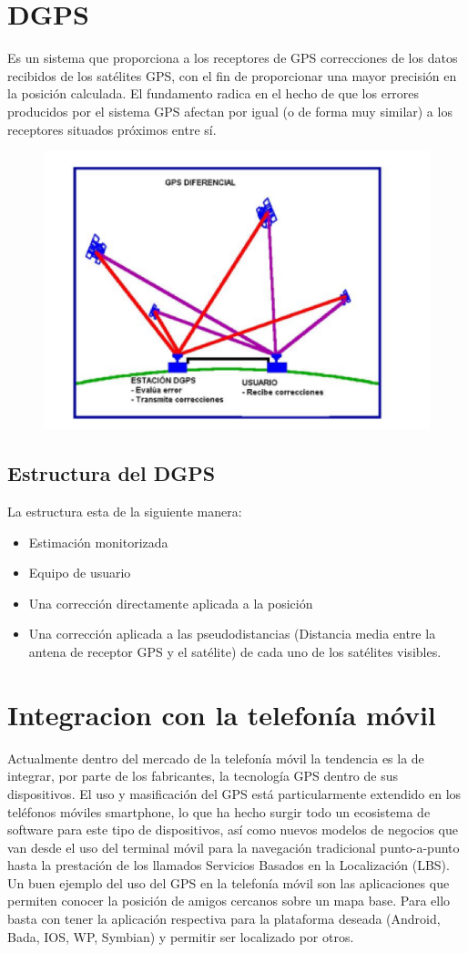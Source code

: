 \section{DGPS}
Es un sistema que proporciona a los receptores de GPS correcciones de los datos recibidos de los satélites GPS, con el fin de proporcionar una mayor precisión en la posición calculada.
El fundamento radica en el hecho de que los errores producidos por el sistema GPS afectan por igual (o de forma muy similar) a los receptores situados próximos entre sí.
\begin{figure}[htbp]
	\begin{center}
		\includegraphics[width=.3\textwidth]{images/imgmarco/dgps}
		\label{fig:dgps}
	\end{center}
\end{figure}
\subsection{Estructura del DGPS}
La estructura esta de la siguiente manera:
\begin{itemize}
\item Estimación monitorizada
\item Equipo de usuario 
\item Una corrección directamente aplicada a la posición 
\item Una corrección aplicada a las pseudodistancias (Distancia media entre la antena de receptor GPS y el satélite) de cada uno de los satélites visibles.
\end{itemize}

\section{Integracion con la telefonía móvil}
Actualmente dentro del mercado de la telefonía móvil la tendencia es la de integrar, por parte de los fabricantes, la tecnología GPS dentro de sus dispositivos. El uso y masificación del GPS está particularmente extendido en los teléfonos móviles smartphone, lo que ha hecho surgir todo un ecosistema de software para este tipo de dispositivos, así como nuevos modelos de negocios que van desde el uso del terminal móvil para la navegación tradicional punto-a-punto hasta la prestación de los llamados Servicios Basados en la Localización (LBS).
Un buen ejemplo del uso del GPS en la telefonía móvil son las aplicaciones que permiten conocer la posición de amigos cercanos sobre un mapa base. Para ello basta con tener la aplicación respectiva para la plataforma deseada (Android, Bada, IOS, WP, Symbian) y permitir ser localizado por otros.


